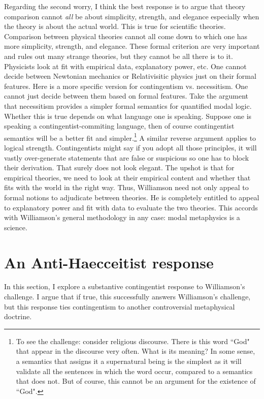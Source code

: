 Regarding the second worry, I think the best response is to argue that theory comparison cannot \emph{all} be about simplicity, strength, and elegance especially when the theory is about the actual world. This is true for scientific theories. Comparison between physical theories cannot all come down to which one has more simplicity, strength, and elegance. These formal criterion are very important and rules out many strange theories, but they cannot be all there is to it. Physicists look at fit with empirical data, explanatory power, etc. One cannot decide between Newtonian mechanics or Relativisitic physics just on their formal features. 
Here is a more specific version for contingentism vs. necessitism. One cannot just decide between them based on formal features. Take the argument that necessitism provides a simpler formal semantics for quantified modal logic. Whether this is true depends on what language one is speaking. Suppose one is speaking a contingentist-commiting language, then of course contingentist semantics will be a better fit and simpler.\footnote{To see the challenge: consider religious discourse. There is this word ``God" that appear in the discourse very often. What is its meaning? In some sense, a semantics that assigns it a supernatural being is the simplest as it will validate all the sentences in which the word occur, compared to a semantics that does not. But of course, this cannot be an argument for the existence of ``God".} A similar reverse argument applies to logical strength. Contingentists might say if you adopt all those principles, it will vastly over-generate statements that are false or suspicious so one has to block their derivation. That surely does not look elegant. The upshot is that for empirical theories, we need to look at their empirical content and whether that fits with the world in the right way. 
Thus, Williamson need not only appeal to formal notions to adjudicate between theories. He is completely entitled to appeal to explanatory power and fit with data to evaluate the two theories. This accords with Williamson's general methodology in any case: modal metaphysics is a science. 

\section{An Anti-Haecceitist response}
In this section, I explore a substantive contingentist response to Williamson's challenge. I argue that if true, this successfully answers Williamson's challenge, but this response ties contingentism to another controversial metaphysical doctrine. 

